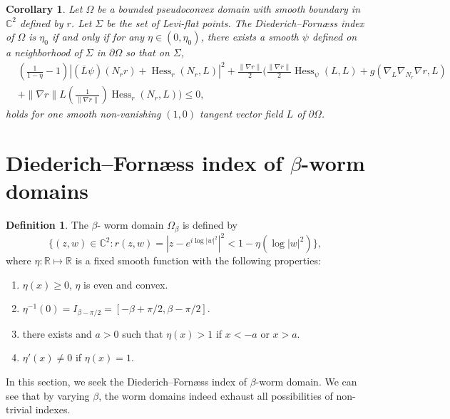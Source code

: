 \documentclass[11pt]{article}
\theoremstyle{plain} \numberwithin{equation}{section}
\newtheorem{corollary}[theorem]{Corollary}
\theoremstyle{definition}
\newtheorem{definition}[theorem]{Definition}
\DeclareMathOperator{\Hessian}{Hess}
\begin{document}
\begin{corollary}\label{c2}
	Let $\Omega$ be a bounded pseudoconvex domain with smooth boundary in $\mathbb{C}^2$ defined by $r$. Let $\Sigma$ be the set of Levi-flat points. The Diederich--Forn\ae ss index of $\Omega$ is $\eta_0$ if and only if for any $\eta\in(0, \eta_0)$, there exists a smooth $\psi$ defined on a neighborhood of $\Sigma$ in $\partial\Omega$ so that on $\Sigma$, \[\begin{split}
	&\left(\frac{1}{1-\eta}-1\right)\left|(\overline{L}\psi)(N_rr)+\Hessian_r(N_r, L)\right|^2+\frac{\|\nabla r\|}{2}\Bigg(\frac{\|\nabla r\|}{2}\Hessian_\psi(L, L)+g(\nabla_L\nabla_{N_r}\nabla r, L)\\&+\|\nabla r\|L\left(\frac{1}{\|\nabla r\|}\right)\Hessian_r(N_r, L)\Bigg)\leq 0,
	\end{split}
	\] holds for one smooth non-vanishing $(1,0)$ tangent vector field $L$ of $\partial\Omega$.
\end{corollary}





\section{Diederich--Forn\ae ss index of $\beta$-worm domains}\label{sec3}

\begin{definition}\label{worm}
	The $\beta$- worm domain $\Omega_\beta$ is defined by \[\lbrace (z, w)\in\mathbb{C}^2: r(z, w)=\left|z-e^{i\log|w|^2}\right|^2<1-\eta(\log|w|^2)\rbrace,\] where $\eta: \mathbb{R}\mapsto\mathbb{R}$ is a fixed smooth function with the following properties:	\begin{enumerate}
		\item $\eta(x)\geq 0$, $\eta$ is even and convex.
		\item $\eta^{-1}(0)=I_{\beta-\pi/2}=[-\beta+\pi/2, \beta-\pi/2]$.
		\item there exists and $a>0$ such that $\eta(x)>1$ if $x<-a$ or $x>a$.
		\item $\eta'(x)\neq 0$ if $\eta(x)=1$.
	\end{enumerate}
\end{definition}


In this section, we seek the Diederich--Forn\ae ss index of $\beta$-worm domain. We can see that by varying $\beta$, the worm domains indeed exhaust all possibilities of non-trivial indexes. 
\end{document}
